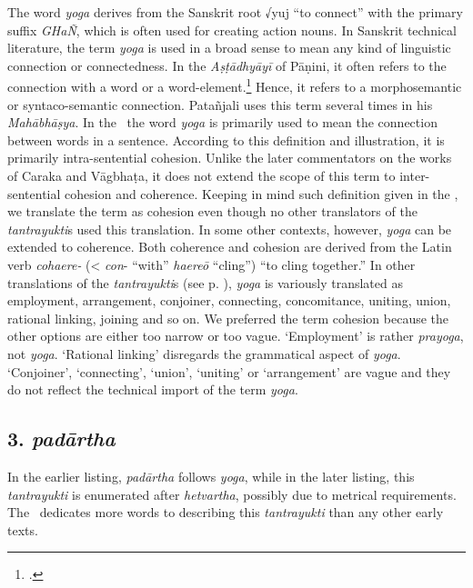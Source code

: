The word \emph{yoga} derives from the Sanskrit root √yuj “to connect” with the 
primary suffix \emph{GHaÑ}, which is often used for creating action nouns. In 
Sanskrit technical literature, the term \emph{yoga} is used in a broad sense to 
mean any kind of linguistic connection or connectedness. In the 
\emph{Aṣṭādhyāyī} of Pāṇini, it often refers to the connection with a word or a 
word-element.\footnote{\cite[64]{josh-1991}.} Hence, it refers to a 
morphosemantic or syntaco-semantic connection. Patañjali uses this term several 
times in his \emph{Mahābhāṣya}. In the \SS\, the word \emph{yoga} is primarily 
used to mean the connection between words in a sentence. According to this 
definition and illustration, it is primarily intra-sentential cohesion. Unlike the later 
commentators on the works of Caraka and Vāgbhaṭa, it does not extend the 
scope 
of this term to inter-sentential cohesion and coherence. Keeping in mind such 
definition given in the \SS, we translate the term as cohesion even though no 
other 
translators of the \emph{tantrayukti}s used this translation. In some other 
contexts, however, \emph{yoga} can be extended to coherence. Both coherence 
and cohesion are derived from the Latin verb \emph{cohaere-} (< \emph{con}- 
“with” \emph{haereō} “cling”) “to cling together.”  In other translations of the 
\emph{tantrayukti}s (see p. \pageref{tantra-trans}), \emph{yoga} is variously 
translated as employment, arrangement, conjoiner, connecting, concomitance, 
uniting, union, rational linking, joining and so on. We preferred the term cohesion 
because the other options are either too narrow or too vague. `Employment' is 
rather \emph{prayoga}, not \emph{yoga}. `Rational linking' disregards the 
grammatical aspect of \emph{yoga}. `Conjoiner', `connecting', `union', `uniting' 
or 
`arrangement' are vague and they do not reflect the technical import of the term 
\emph{yoga}.

\subsection{3. \emph{padārtha}}

In the earlier listing, \emph{padārtha} follows \emph{yoga}, while in the later 
listing, this \emph{tantrayukti} is enumerated after \emph{hetvartha}, possibly 
due to metrical requirements. The \SS\ dedicates more words to describing this 
\emph{tantrayukti} than any other early texts.

